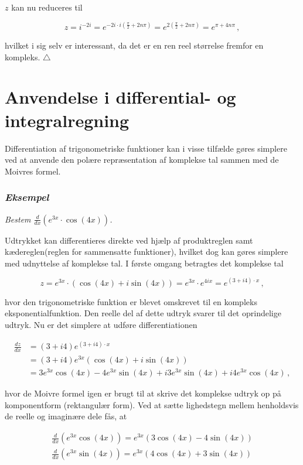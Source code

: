 \documentclass[a4paper, 12pt,titlepage]{article}
\begin{document}
\(z\) kan nu reduceres til

$$z = i^{-2 i} = e^{- 2 i \cdot i \left( \frac{\pi}{2} + 2 n \pi \right)} = e^{2\left( \frac{\pi}{2} + 2 n \pi \right)} = e^{\pi + 4 n \pi}\,,  $$ 

hvilket i sig selv er interessant, da det er en ren reel størrelse fremfor en kompleks. \(\triangle\)

\section{Anvendelse i differential- og integralregning}
\label{sec:org1b7a07b}

Differentiation af trigonometriske funktioner kan i visse tilfælde gøres simplere ved at anvende den polære repræsentation af komplekse tal sammen med de Moivres formel.

\subsubsection*{\emph{Eksempel}}
\label{sec:orgf619e0a}
\emph{Bestem \(\frac{d}{d x} \left( e^{3x} \cdot \cos(4x) \right)\).}

Udtrykket kan differentieres direkte ved hjælp af produktreglen samt kædereglen(reglen for sammensatte funktioner), hvilket dog kan gøres simplere med udnyttelse af komplekse tal. I første omgang betragtes det komplekse tal

$$z= e^{3x} \cdot \left(\cos(4x)+ i \sin(4x)\right) = e^{3x} \cdot e^{4ix} = e^{(3+i4)\cdot x} \,,$$

hvor den trigonometriske funktion er blevet omskrevet til en kompleks eksponentialfunktion. Den reelle del af dette udtryk svarer til det oprindelige udtryk. Nu er det simplere at udføre differentiationen

\begin{align*}
    \frac{d z}{d x} &= (3+i4) e^{(3+i4)\cdot x} \\
                    &= (3+i4) e^{3x}(\cos(4x) + i \sin(4x))\\
                    &= 3 e^{3x} \cos(4x) -4 e^{3x} \sin(4x) +i 3 e^{3x} \sin(4x) + i 4 e^{3x} \cos(4x)\,,
\end{align*}

hvor de Moivre formel igen er brugt til at skrive det komplekse udtryk op på komponentform (rektangulær form). Ved at sætte lighedstegn mellem henholdsvis de reelle og imaginære dele fås, at 

\begin{align*}
\frac{d}{d x} \left( e^{3x} \cos(4x)\right) = e^{3x} \left(3 \cos(4x) -4 \sin(4x)\right)\\
\frac{d}{d x} \left( e^{3x} \sin(4x)\right) = e^{3x} \left(4 \cos(4x) +3 \sin(4x)\right)
\end{align*}
\end{document}
